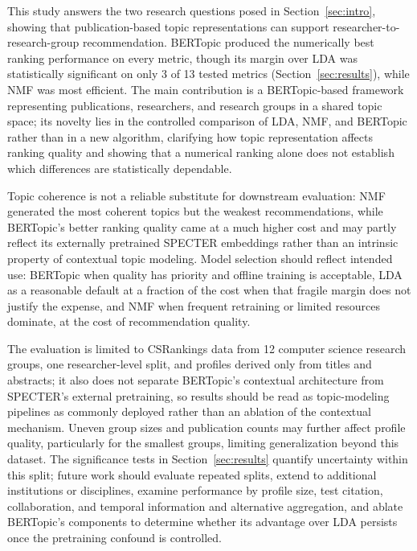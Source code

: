 This study answers the two research questions posed in Section~\ref{sec:intro}, showing that publication-based topic representations can support researcher-to-research-group recommendation. BERTopic produced the numerically best ranking performance on every metric, though its margin over LDA was statistically significant on only 3 of 13 tested metrics (Section~\ref{sec:results}), while NMF was most efficient. The main contribution is a BERTopic-based framework representing publications, researchers, and research groups in a shared topic space; its novelty lies in the controlled comparison of LDA, NMF, and BERTopic rather than in a new algorithm, clarifying how topic representation affects ranking quality and showing that a numerical ranking alone does not establish which differences are statistically dependable.

Topic coherence is not a reliable substitute for downstream evaluation: NMF generated the most coherent topics but the weakest recommendations, while BERTopic's better ranking quality came at a much higher cost and may partly reflect its externally pretrained SPECTER embeddings rather than an intrinsic property of contextual topic modeling. Model selection should reflect intended use: BERTopic when quality has priority and offline training is acceptable, LDA as a reasonable default at a fraction of the cost when that fragile margin does not justify the expense, and NMF when frequent retraining or limited resources dominate, at the cost of recommendation quality.

The evaluation is limited to CSRankings data from 12 computer science research groups, one researcher-level split, and profiles derived only from titles and abstracts; it also does not separate BERTopic's contextual architecture from SPECTER's external pretraining, so results should be read as topic-modeling pipelines as commonly deployed rather than an ablation of the contextual mechanism. Uneven group sizes and publication counts may further affect profile quality, particularly for the smallest groups, limiting generalization beyond this dataset. The significance tests in Section~\ref{sec:results} quantify uncertainty within this split; future work should evaluate repeated splits, extend to additional institutions or disciplines, examine performance by profile size, test citation, collaboration, and temporal information and alternative aggregation, and ablate BERTopic's components to determine whether its advantage over LDA persists once the pretraining confound is controlled.
